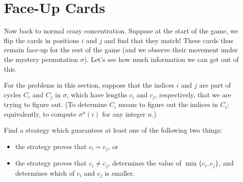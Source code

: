 \documentclass[10pt]{article}
\newif\ifpaper
\begin{document}
%
\section{Face-Up Cards}
Now back to normal crazy concentration.
Suppose at the start of the game,
we flip the cards in positions $i$ and $j$ and find that they match!
These cards thus remain face-up for the rest of the game
(and we observe their movement under the mystery permutation $\sigma$).
Let's see how much information we can get out of this.

For the problems in this section,
suppose that the indices $i$ and $j$ are part of cycles $C_i$ and $C_j$ in $\sigma$,
which have lengths $c_i$ and $c_j$, respectively, that we are trying to figure out.
(To determine $C_i$ means to figure out the indices in $C_i$;
equivalently, to compute $\sigma^n(i)$ for any integer $n$.)

\begin{problem}[6 points]
    Find a strategy which guarantees at least one of the following two things:
    \begin{itemize}
        \item the strategy proves that $c_i = c_j$, or
        \item the strategy proves that $c_i \neq c_j$,
        determines the value of $\min\{c_i,c_j\}$,
        and determines which of $c_i$ and $c_j$ is smaller.
    \end{itemize}
\end{problem}

\ifpaper
\begin{tcolorbox}
    signal argument. TODO.
    (Cody's original does not work.)
\end{tcolorbox}
\fi
\end{document}
